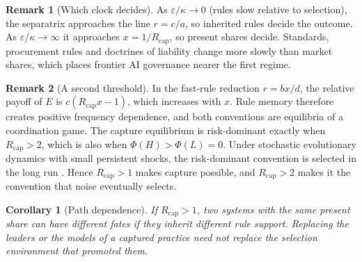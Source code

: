 \documentclass[11pt]{article}
\theoremstyle{plain}
\newtheorem{corollary}{Corollary}
\theoremstyle{definition}
\newtheorem{remark}{Remark}
\newcommand{\Rcap}{R_{\mathrm{cap}}}
\begin{document}
\begin{remark}[Which clock decides]\label{rem:clocks}
As $\varepsilon/\kappa\to0$ (rules slow relative to selection), the separatrix approaches the line $r=c/a$, so inherited rules decide the outcome. As $\varepsilon/\kappa\to\infty$ it approaches $x=1/\Rcap$, so present shares decide. Standards, procurement rules and doctrines of liability change more slowly than market shares, which places frontier AI governance nearer the first regime.
\end{remark}

\begin{remark}[A second threshold]\label{rem:riskdominance}
In the fast-rule reduction $r=bx/d$, the relative payoff of $E$ is $c(\Rcap x-1)$, which increases with $x$. Rule memory therefore creates positive frequency dependence, and both conventions are equilibria of a coordination game. The capture equilibrium is risk-dominant exactly when $\Rcap>2$, which is also when $\Phi(H)>\Phi(L)=0$. Under stochastic evolutionary dynamics with small persistent shocks, the risk-dominant convention is selected in the long run \citep{kandori1993,young1993}. Hence $\Rcap>1$ makes capture possible, and $\Rcap>2$ makes it the convention that noise eventually selects.
\end{remark}

\begin{corollary}[Path dependence]\label{cor:path}
If $\Rcap>1$, two systems with the same present share can have different fates if they inherit different rule support. Replacing the leaders or the models of a captured practice need not replace the selection environment that promoted them.
\end{corollary}
\end{document}
